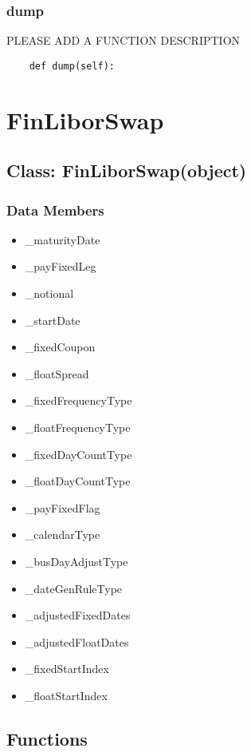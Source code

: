 \documentclass[twoside,11pt]{book}
\begin{document}
\subsubsection*{{\bf dump}}
PLEASE ADD A FUNCTION DESCRIPTION

\begin{lstlisting}
    def dump(self):
\end{lstlisting}

\newpage
\section{FinLiborSwap}

\subsection*{Class: FinLiborSwap(object)}


\subsubsection*{Data Members}
\begin{itemize}
\item{\_maturityDate}
\item{\_payFixedLeg}
\item{\_notional}
\item{\_startDate}
\item{\_fixedCoupon}
\item{\_floatSpread}
\item{\_fixedFrequencyType}
\item{\_floatFrequencyType}
\item{\_fixedDayCountType}
\item{\_floatDayCountType}
\item{\_payFixedFlag}
\item{\_calendarType}
\item{\_busDayAdjustType}
\item{\_dateGenRuleType}
\item{\_adjustedFixedDates}
\item{\_adjustedFloatDates}
\item{\_fixedStartIndex}
\item{\_floatStartIndex}
\end{itemize}

\subsection*{Functions}
\end{document}
